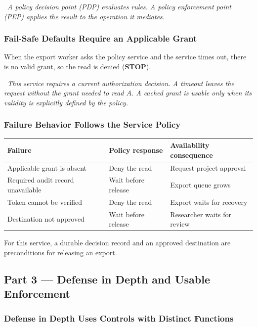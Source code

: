 \documentclass[hidelinks]{article}
\newcommand{\callout}[1]{\par\smallskip\noindent{\color{capri}$\blacktriangleright$}\ \textit{#1}\par\smallskip}
\begin{document}
\callout{A policy decision point (PDP) evaluates rules. A policy enforcement point (PEP) applies the result to the operation it mediates.}

\subsubsection{Fail-Safe Defaults Require an Applicable Grant}

When the export worker asks the policy service and the service times out, there is no valid grant, so the read is denied (\textbf{STOP}).

\callout{This service requires a current authorization decision. A timeout leaves the request without the grant needed to read $A$. A cached grant is usable only when its validity is explicitly defined by the policy.}

\subsubsection{Failure Behavior Follows the Service Policy}

\begin{center}
\color{white}
\begin{tabular}{p{4.3cm}p{3.3cm}p{5.2cm}}
\hline
\textbf{Failure} & \textbf{Policy response} & \textbf{Availability consequence}\\ \hline
Applicable grant is absent & Deny the read & Request project approval\\
Required audit record unavailable & Wait before release & Export queue grows\\
Token cannot be verified & Deny the read & Export waits for recovery\\
Destination not approved & Wait before release & Researcher waits for review\\ \hline
\end{tabular}
\end{center}
For this service, a durable decision record and an approved destination are preconditions for releasing an export.

\subsection{Part 3 --- Defense in Depth and Usable Enforcement}

\subsubsection{Defense in Depth Uses Controls with Distinct Functions}
\end{document}

